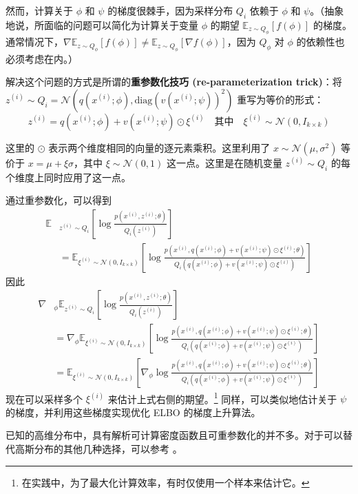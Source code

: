 然而，计算关于 $\phi$ 和 $\psi$ 的梯度很棘手，因为采样分布 $Q_i$ 依赖于 $\phi$ 和 $\psi$。（抽象地说，所面临的问题可以简化为计算关于变量 $\phi$ 的期望 $\mathbb{E}_{z \sim Q_\phi} [f(\phi)]$ 的梯度。通常情况下，$\nabla \mathbb{E}_{z \sim Q_\phi} [f(\phi)] \neq \mathbb{E}_{z \sim Q_\phi} [\nabla f(\phi)]$，因为 $Q_\phi$ 对 $\phi$ 的依赖性也必须考虑在内。）

解决这个问题的方式是所谓的\textbf{重参数化技巧 (re-parameterization trick)}：将 $z^{(i)} \sim Q_i = \mathcal{N}(q(x^{(i)}; \phi), \text{diag}(v(x^{(i)}; \psi))^2)$ 重写为等价的形式：
\begin{equation}
    z^{(i)} = q(x^{(i)}; \phi) + v(x^{(i)}; \psi) \odot \xi^{(i)} \quad \text{其中} \quad \xi^{(i)} \sim \mathcal{N}(0, I_{k \times k}) \label{eq:11.24}
\end{equation}

这里的 $\odot$ 表示两个维度相同的向量的逐元素乘积。这里利用了 $x \sim \mathcal{N}(\mu, \sigma^2)$ 等价于 $x = \mu + \xi \sigma$，其中 $\xi \sim \mathcal{N}(0, 1)$ 这一点。这里是在随机变量 $z^{(i)} \sim Q_i$ 的每个维度上同时应用了这一点。

通过重参数化，可以得到
\begin{align}
    \mathbb{E}&_{z^{(i)} \sim Q_i} \left[ \log \frac{p(x^{(i)}, z^{(i)}; \theta)}{Q_i(z^{(i)})} \right] \label{eq:11.25}\\
    &= \mathbb{E}_{\xi^{(i)} \sim \mathcal{N}(0, I_{k \times k})} \left[ \log \frac{p(x^{(i)}, q(x^{(i)}; \phi) + v(x^{(i)}; \psi) \odot \xi^{(i)}; \theta)}{Q_i(q(x^{(i)}; \phi) + v(x^{(i)}; \psi) \odot \xi^{(i)})} \right] \nonumber
\end{align}
因此
\begin{align*}
    \nabla&_\phi \mathbb{E}_{z^{(i)} \sim Q_i} \left[ \log \frac{p(x^{(i)}, z^{(i)}; \theta)}{Q_i(z^{(i)})} \right] \\
    &= \nabla_\phi \mathbb{E}_{\xi^{(i)} \sim \mathcal{N}(0, I_{k \times k})} \left[ \log \frac{p(x^{(i)}, q(x^{(i)}; \phi) + v(x^{(i)}; \psi) \odot \xi^{(i)}; \theta)}{Q_i(q(x^{(i)}; \phi) + v(x^{(i)}; \psi) \odot \xi^{(i)})} \right] \\
    &= \mathbb{E}_{\xi^{(i)} \sim \mathcal{N}(0, I_{k \times k})} \left[ \nabla_\phi \log \frac{p(x^{(i)}, q(x^{(i)}; \phi) + v(x^{(i)}; \psi) \odot \xi^{(i)}; \theta)}{Q_i(q(x^{(i)}; \phi) + v(x^{(i)}; \psi) \odot \xi^{(i)})} \right]
\end{align*}
现在可以采样多个 $\xi^{(i)}$ 来估计上式右侧的期望。\footnote{在实践中，为了最大化计算效率，有时仅使用一个样本来估计它。} 同样，可以类似地估计关于 $\psi$ 的梯度，并利用这些梯度实现优化 ELBO 的梯度上升算法。

已知的高维分布中，具有解析可计算密度函数且可重参数化的并不多。对于可以替代高斯分布的其他几种选择，可以参考 \cite{kingma2013auto}。



